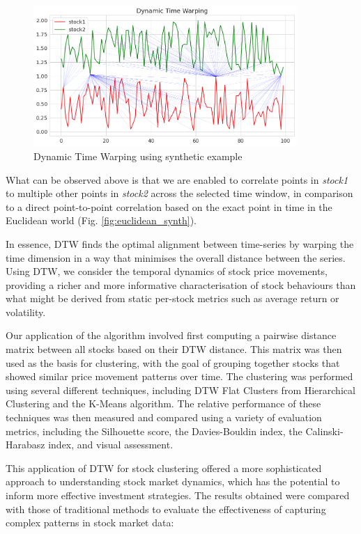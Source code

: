 \documentclass[11pt]{article}
\begin{document}
\begin{figure}[H]
\centering
\includegraphics[width=10cm]{img/dtw-sample.png} 
\caption{Dynamic Time Warping using synthetic example}

\end{figure}

What can be observed above is that we are enabled to correlate points in \textit{stock1} to multiple other points in \textit{stock2} across the selected time window, in comparison to a direct point-to-point correlation based on the exact point in time in the Euclidean world (Fig. \ref{fig:euclidean_synth}).

In essence, DTW finds the optimal alignment between time-series by warping the time dimension in a way that minimises the overall distance between the series. Using DTW, we consider the temporal dynamics of stock price movements, providing a richer and  more informative characterisation of stock behaviours than what might be derived from static per-stock metrics such as average return or volatility. 

Our application of the algorithm involved first computing a pairwise distance matrix between all stocks based on their DTW distance. This matrix was then used as the basis for clustering, with the goal of grouping together stocks that showed similar price movement patterns over time. The clustering was performed using several different techniques, including DTW Flat Clusters from Hierarchical Clustering and the K-Means algorithm. The relative performance of these techniques was then measured and compared using a variety of evaluation metrics, including the Silhouette score, the Davies-Bouldin index, the Calinski-Harabasz index, and visual assessment.

This application of DTW for stock clustering offered a more sophisticated approach to understanding stock market dynamics, which has the potential to inform more effective investment strategies. The results obtained were compared with those of traditional methods to evaluate the effectiveness of capturing complex patterns in stock market data: 
\end{document}
